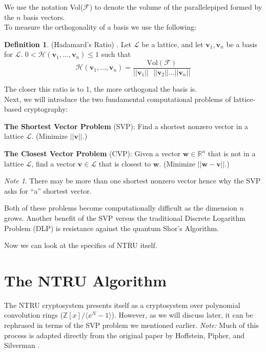 \documentclass[12pt]{amsart}
\theoremstyle{definition}
\newtheorem*{definition}{Definition}
\theoremstyle{remark}
\newtheorem*{note}{Note}
\newcommand{\R}{\mathbb{R}}
\newcommand{\Z}{\mathbb{Z}}
\begin{document}
\noindent We use the notation Vol($\mathcal{F}$) to denote the volume of the parallelepiped formed by the $n$ basis vectors.\\

To measure the orthogonality of a basis we use the following:
\begin{definition}
(Hadamard's Ratio) \cite{DecadeSum}. Let $\mathcal{L}$ be a lattice, and let $\bm{v}_1,\bm{v}_n$ be a basis for $\mathcal{L}$. $0< \mathcal{H}(\bm{v}_1,\dots,\bm{v}_n) \leq 1$ such that 
$$\mathcal{H}(\bm{v}_1,\dots,\bm{v}_n) = \frac{\text{Vol}(\mathcal{F})}{\lvert\lvert\bm{v}_1\rvert\rvert\text{ } \lvert\lvert\bm{v}_2\rvert\rvert \dots \lvert\lvert\bm{v}_n\rvert\rvert}$$
\end{definition}

\noindent The closer this ratio is to 1, the more orthogonal the basis is.\\

Next, we will introduce the two fundamental computational problems of lattice-based cryptography:

\textbf{The Shortest Vector Problem} (SVP): Find a shortest nonzero vector in a lattice $\mathcal{L}$. (Minimize $\lvert\lvert \bm{v}\rvert\rvert.$)

\textbf{The Closest Vector Problem} (CVP): Given a vector $\bm{w}\in\R^n$ that is not in a lattice $\mathcal{L}$, find a vector $\bm{v}\in\mathcal{L}$ that is closest to $\bm{w}$. (Minimize $\lvert\lvert \bm{w}-\bm{v}\rvert\rvert$.)

\begin{note}
There may be more than one shortest nonzero vector hence why the SVP asks for ``a'' shortest vector.
\end{note}

Both of these problems become computationally difficult as the dimension $n$ grows. Another benefit of the SVP versus the traditional Discrete Logarithm Problem (DLP) is resistance against the quantum Shor's Algorithm. 

Now we can look at the specifics of NTRU itself.

\section{The NTRU Algorithm}

The NTRU cryptosystem presents itself as a cryptosystem over polynomial convolution rings ($\Z[x]/\langle x^N - 1\rangle$). However, as we will discuss later, it can be rephrased in terms of the SVP problem we mentioned earlier. 
\textit{Note:} Much of this process is adapted directly from the original paper by Hoffstein, Pipher, and Silverman \cite{NTRUpatent}.
\end{document}
